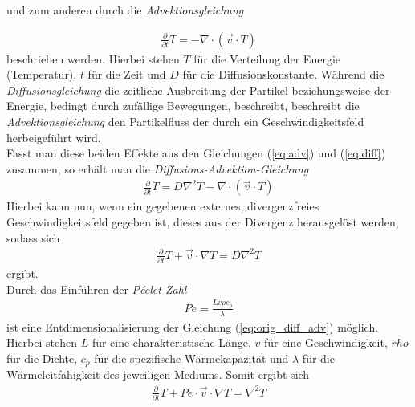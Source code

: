 \documentclass[12pt,a4paper,titlepage,headinclude,bibtotoc]{scrartcl}
\begin{document}
und zum anderen durch die \textit{Advektionsgleichung}

\begin{align}
\label{eq:adv}
\frac{\partial}{\partial t}T = - \nabla \cdot (\vec{v}\cdot T)
\end{align}
beschrieben werden. Hierbei stehen $T$ für die Verteilung der Energie (Temperatur), $t$ für die Zeit und $D$ für die Diffusionskonstante.
Während die \textit{Diffusionsgleichung} die zeitliche Ausbreitung der Partikel beziehungsweise der Energie, bedingt durch zufällige Bewegungen, beschreibt, beschreibt die \textit{Advektionsgleichung} den Partikelfluss der durch ein Geschwindigkeitsfeld herbeigeführt wird.\\
Fasst man diese beiden Effekte aus den Gleichungen (\ref{eq:adv}) und (\ref{eq:diff}) zusammen, so erhält man die \textit{Diffusions-Advektion-Gleichung}
\begin{align*}
\frac{\partial}{\partial t}T = D \nabla^2 T - \nabla \cdot (\vec{v}\cdot T)
\end{align*}
Hierbei kann nun, wenn ein gegebenen externes, divergenzfreies Geschwindigkeitsfeld gegeben ist, dieses aus der Divergenz herausgelöst werden, sodass sich
\begin{align}
\label{eq:orig_diff_adv}
\frac{\partial}{\partial t} T + \vec{v} \cdot \nabla T = D \nabla^2 T
\end{align}
ergibt.\\
Durch das Einführen der \textit{Péclet-Zahl}
\begin{align*}
Pe = \frac{L v \rho c_p}{\lambda}
\end{align*}
ist eine Entdimensionalisierung der Gleichung (\ref{eq:orig_diff_adv}) möglich. Hierbei stehen $L$ für eine charakteristische Länge, $v$ für eine Geschwindigkeit, $rho$ für die Dichte, $c_p$ für die spezifische Wärmekapazität und $\lambda$ für die Wärmeleitfähigkeit des jeweiligen Mediums. Somit ergibt sich
\begin{align}
\label{eq:diff_adv}
\frac{\partial}{\partial t} T + Pe \cdot \vec{v} \cdot \nabla T = \nabla^2 T
\end{align}
\end{document}
